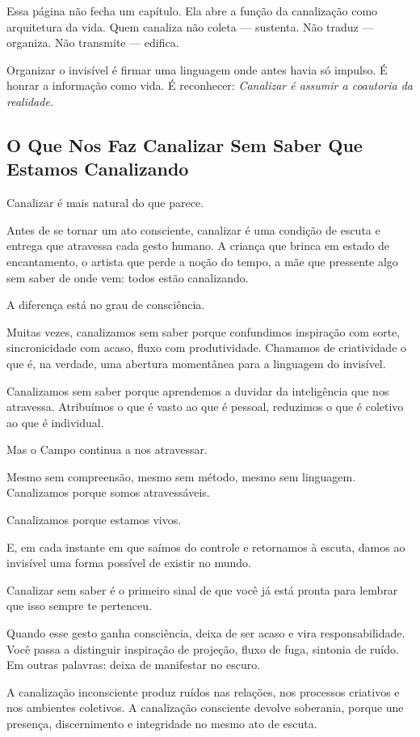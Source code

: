 \documentclass[12pt]{book}
\begin{document}
Essa página não fecha um capítulo. Ela abre a função da canalização como arquitetura da vida. Quem canaliza não coleta --- sustenta. Não traduz --- organiza. Não transmite --- edifica.

Organizar o invisível é firmar uma linguagem onde antes havia só impulso. É honrar a informação como vida. É reconhecer: \textit{Canalizar é assumir a coautoria da realidade.}

\subsection*{O Que Nos Faz Canalizar Sem Saber Que Estamos Canalizando}

Canalizar é mais natural do que parece.

Antes de se tornar um ato consciente, canalizar é uma condição de escuta e entrega que atravessa cada gesto humano. A criança que brinca em estado de encantamento, o artista que perde a noção do tempo, a mãe que pressente algo sem saber de onde vem: todos estão canalizando.

A diferença está no grau de consciência.

Muitas vezes, canalizamos sem saber porque confundimos inspiração com sorte, sincronicidade com acaso, fluxo com produtividade. Chamamos de criatividade o que é, na verdade, uma abertura momentânea para a linguagem do invisível.

Canalizamos sem saber porque aprendemos a duvidar da inteligência que nos atravessa. Atribuímos o que é vasto ao que é pessoal, reduzimos o que é coletivo ao que é individual.

Mas o Campo continua a nos atravessar.

Mesmo sem compreensão, mesmo sem método, mesmo sem linguagem. Canalizamos porque somos atravessáveis.

Canalizamos porque estamos vivos.

E, em cada instante em que saímos do controle e retornamos à escuta, damos ao invisível uma forma possível de existir no mundo.

Canalizar sem saber é o primeiro sinal de que você já está pronta para lembrar que isso sempre te pertenceu.

Quando esse gesto ganha consciência, deixa de ser acaso e vira responsabilidade. Você passa a distinguir inspiração de projeção, fluxo de fuga, sintonia de ruído. Em outras palavras: deixa de manifestar no escuro.

A canalização inconsciente produz ruídos nas relações, nos processos criativos e nos ambientes coletivos. A canalização consciente devolve soberania, porque une presença, discernimento e integridade no mesmo ato de escuta.
\end{document}
